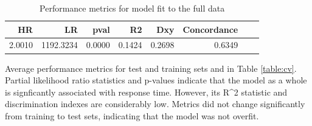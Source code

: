 \documentclass{article}
\begin{document}
\begin{table}[!htbp]
\centering
\caption{Performance metrics for model fit to the full data} 
\begin{tabular}{rrrrrrrr}
  \hline
  HR & LR & pval & R2 & Dxy & Concordance \\ 
  \hline
  2.0010 & 1192.3234 & 0.0000 & 0.1424 & 0.2698 & 0.6349 \\ 
   \hline
\end{tabular}
\label{table:finalmetrics}
\end{table}

Average performance metrics for test and training sets and in Table \ref{table:cv}. Partial likelihood ratio statistics and p-values indicate that the model as a whole is signficantly associated with response time. However, its R^2 statistic and discrimination indexes are considerably low. Metrics did not change significantly from training to test sets, indicating that the model was not overfit. 
\end{document}

